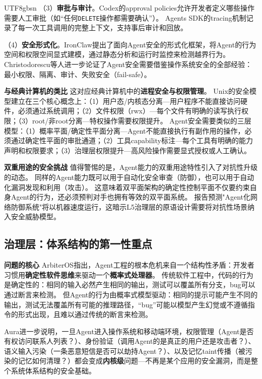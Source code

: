 \documentclass[11pt,a4paper]{article}
\begin{document}
\begin{CJK*}{UTF8}{gbsn}
（3）\textbf{审批与审计}。Codex的approval policies\cite{openai_codex_approvals_2026}允许开发者定义哪些操作需要人工审批（如``任何\texttt{DELETE}操作都需要确认''）。
Agents SDK的tracing机制\cite{openai_codex_agentsdk_2026}记录了每一次工具调用的完整上下文，支持事后审计和回放。

（4）\textbf{安全形式化}。IronClaw\cite{ironclaw2025}提出了面向Agent安全的形式化框架，将Agent的行为空间和权限空间显式建模，通过静态分析和运行时监控来检测越界行为。
Christodorescu等人\cite{agenticsecurity2025}进一步论证了Agent安全需要借鉴操作系统安全的全部经验：最小权限、隔离、审计、失败安全（fail-safe）。

\textbf{与经典计算机的类比}
这对应经典计算机中的\textbf{进程安全与权限管理}。
Unix的安全模型建立在三个核心概念上：（1）用户态/内核态分离---用户程序不能直接访问硬件，必须通过系统调用\cite{ostep_2023}；（2）文件权限（rwx）---每个文件有明确的读写执行权限；（3）root/非root分离---特权操作需要权限提升。
Agent安全需要类似的三层模型：（1）概率平面/确定性平面分离---Agent不能直接执行有副作用的操作，必须通过确定性平面的审批通道；（2）工具capability标注---每个工具有明确的能力声明和权限要求；（3）治理层权限提升---高风险操作需要显式授权或人工确认。

\textbf{双重用途的安全挑战}
值得警惕的是，Agent能力的双重用途特性引入了对抗性升级的动态。
同样的Agent能力既可以用于自动化安全审查（防御），也可以用于自动化漏洞发现和利用（攻击）\cite{anthropic2026agenticreport}。
这意味着双平面架构的确定性控制平面不仅要约束自身Agent的行为，还必须预判对手也拥有等效的双平面系统。
报告预测"Agent化网络防御系统"将以机器速度运行\cite{anthropic2026agenticreport}，这暗示L5治理层的原语设计需要将对抗性场景纳入安全威胁模型。

\subsection{治理层：体系结构的第一性重点}

\textbf{问题的核心}
ArbiterOS\cite{arbiteros2025}指出，Agent工程的根本危机来自一个结构性矛盾：开发者习惯用\textbf{确定性软件思维}来驱动一个\textbf{概率式处理器}。
传统软件工程中，代码的行为是确定性的：相同的输入必然产生相同的输出，测试可以覆盖所有分支，bug可以通过断言来检测。
但Agent的行为由概率式模型驱动：相同的提示可能产生不同的输出，测试无法覆盖所有可能的推理路径，``bug''可能以模型产生幻觉或不遵循指令的形式出现，且难以通过传统的断言来检测。

Aura\cite{aura2025}进一步说明，一旦Agent进入操作系统和移动端环境，权限管理（Agent是否有权访问联系人列表？）、身份验证（调用Agent的是真正的用户还是攻击者？）、语义输入污染（一条恶意短信是否可以劫持Agent？）、以及记忆taint传播（被污染的记忆如何清理？）都会变成\textbf{内核级}问题---不再是某个应用的安全漏洞，而是整个系统体系结构的安全基础。


\end{CJK*}
\end{document}
